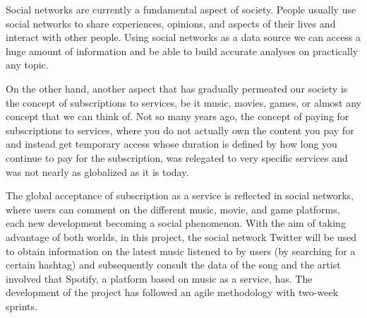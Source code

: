 

\nonzeroparskip Social networks are currently a fundamental aspect of society. People usually use social networks to share experiences, opinions, and aspects of their lives and interact with other people. Using social networks as a data source we can access a huge amount of information and be able to build accurate analyses on practically any topic.

\nonzeroparskip On the other hand, another aspect that has gradually permeated our society is the concept of subscriptions to services, be it music, movies, games, or almost any concept that we can think of. Not so many years ago, the concept of paying for subscriptions to services, where you do not actually own the content you pay for and instead get temporary access whose duration is defined by how long you continue to pay for the subscription, was relegated to very specific services and was not nearly as globalized as it is today.

\nonzeroparskip The global acceptance of subscription as a service is reflected in social networks, where users can comment on the different music, movie, and game platforms, each new development becoming a social phenomenon. With the aim of taking advantage of both worlds, in this project, the social network Twitter will be used to obtain information on the latest music listened to by users (by searching for a certain hashtag) and subsequently consult the data of the song and the artist involved that Spotify, a platform based on music as a service, has. The development of the project has followed an agile methodology with two-week sprints.

